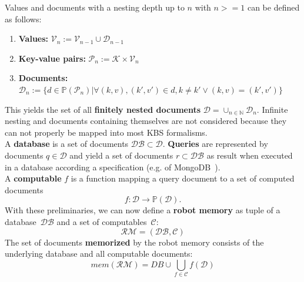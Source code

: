 \documentclass[a4paper,11pt]{article}
\begin{document}
Values and documents with a nesting depth up to $n$ with $n>=1$ can be
defined as follows:
\begin{enumerate}
\item  \textbf{Values:} $\mathcal{V}_n := \mathcal{V}_{n-1} \cup \mathcal{D}_{n-1}$
\item \textbf{Key-value pairs:} $\mathcal{P}_n:=\mathcal{K}\times\mathcal{V}_n$
\item \textbf{Documents:}
  $\mathcal{D}_n:=\{
  d\in\mathbb{P}(\mathcal{P}_n)|
  \forall (k,v),(k',v')\in d , k\neq k' \vee (k,v)=(k',v')
  \}$
\end{enumerate}
This yields the set of all \textbf{finitely nested documents}
$\mathcal{D}=\cup_{n\in\mathbb{N}}\mathcal{D}_n$. Infinite nesting and
documents containing themselves are not considered because they can
not properly be mapped into most KBS formalisms.
\\
A \textbf{database} is a set of documents $\mathcal{DB} \subset \mathcal{D}$.
\textbf{Queries} are represented by documents $q\in\mathcal{D}$ and yield a set
of documents $r\subset\mathcal{DB}$ as result when executed in a database according a
specification (e.g. of MongoDB~\cite{mongodb}).
\\
A \textbf{computable} $f$ is a function mapping a query document to a
set of computed documents
$$f: \mathcal{D} \rightarrow \mathbb{P}(\mathcal{D})\text{.}$$
%
With these preliminaries, we can now define a \textbf{robot memory} as tuple
of a database~$\mathcal{DB}$ and a set of computables~$\mathcal{C}$:
$$\mathcal{RM}=(\mathcal{DB},\mathcal{C})$$
%
The set of documents \textbf{memorized} by the robot memory consists
of the underlying database and all computable documents:
$$mem(\mathcal{RM})=DB \cup \bigcup_{f\in\mathcal{C}}f(\mathcal{D})$$
\end{document}
